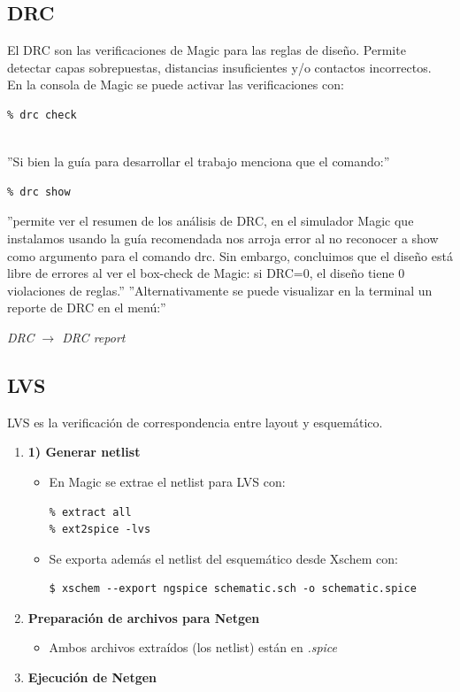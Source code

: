 \subsection{DRC}
\sangria{} El DRC son las verificaciones de Magic para las reglas de diseño. Permite detectar capas sobrepuestas, distancias insuficientes y/o contactos incorrectos. \\ \sangria{} En la consola de Magic se puede activar las verificaciones con:
\begin{verbatim}
% drc check
\end{verbatim}
\\
''Si bien la guía para desarrollar el trabajo menciona que el comando:''
\begin{verbatim}
% drc show
\end{verbatim}
''permite ver el resumen de los análisis de DRC, en el simulador Magic que instalamos usando la guía recomendada nos arroja error al no reconocer a show como argumento para el comando drc. Sin embargo, concluimos que el diseño está libre de errores al ver el box-check de Magic: si DRC=0, el diseño tiene 0 violaciones de reglas.''
''Alternativamente se puede visualizar en la terminal un reporte de DRC en el menú:''
\begin{center}\textit{DRC $\rightarrow$ DRC report} \end{center}
\subsection{LVS}
\sangria{} LVS es la verificación de correspondencia entre layout y esquemático.
\begin{enumerate}
    \item \textbf{1) Generar netlist}
        \begin{itemize}[nosep]
            \item En Magic se extrae el netlist para LVS con:
                \begin{verbatim}
% extract all
% ext2spice -lvs 
                \end{verbatim}

            \item Se exporta además el netlist del esquemático desde Xschem con:
                \begin{verbatim}
$ xschem --export ngspice schematic.sch -o schematic.spice
                \end{verbatim}
        \end{itemize}
    \item \textbf{Preparación de archivos para Netgen}
        \begin{itemize}[nosep]
            \item Ambos archivos extraídos (los netlist) están en \textit{.spice}
        \end{itemize}

    \item \textbf{Ejecución de Netgen}
\end{enumerate}

